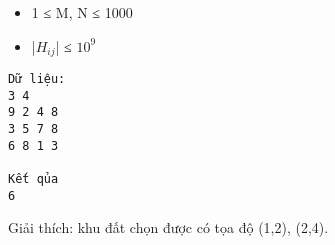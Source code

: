 \begin{itemize}
	\item 1 ≤ M, N ≤ 1000
	\item |$H_{ij}$| ≤ $10^{9}$
\end{itemize}
\begin{verbatim}
Dữ liệu:
3 4
9 2 4 8
3 5 7 8
6 8 1 3

Kết qủa
6
\end{verbatim}

Giải thích: khu đất chọn được có tọa độ (1,2), (2,4).